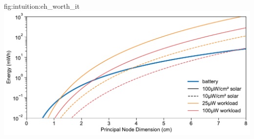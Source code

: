 \begin{definefigure}{fig:intuition:eh_worth_it}
  \centering
  \includegraphics[width=\columnwidth]{figs/is_eh_worth_it_micro.pdf}
  \caption{
  A comparison of preallocated energy and captured energy. Note the logarithmic y-axis scale.
  This figure compares the energy offered by a cubic battery with that of potential harvestable energy captured by a square photovoltaic over the lifetime of the battery. 
  At a sufficient size and in sufficient harvesting conditions, while powering an appropriate workload, solar energy-harvesting can provide more energy over the same time frame as a lithium battery.
  }
\end{definefigure}

